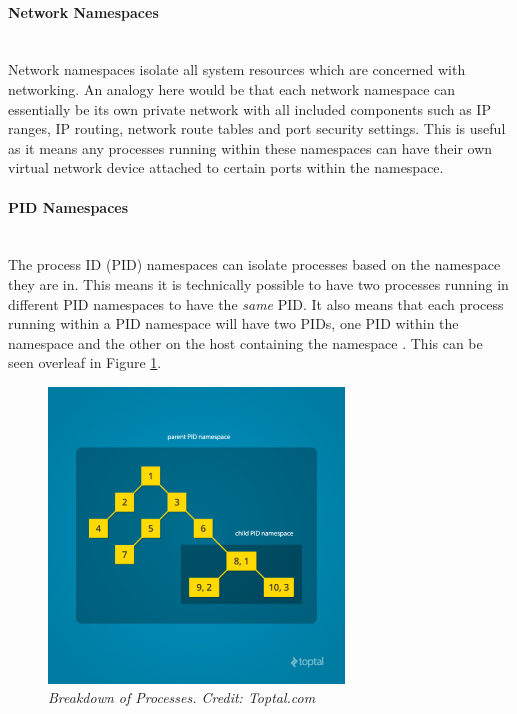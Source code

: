 \documentclass{article}
\begin{document}
\paragraph{Network Namespaces}\mbox{}\\
Network namespaces isolate all system resources which are concerned with networking. An analogy here would be that each network namespace can essentially be its own private network with all included components such as IP ranges, IP routing, network route tables and port security settings. This is useful as it means any processes running within these namespaces can have their own virtual network device attached to certain ports within the namespace.

\paragraph{PID Namespaces}\mbox{}\\
The process ID (PID) namespaces can isolate processes based on the namespace they are in. This means it is technically possible to have two processes running in different PID namespaces to have the \textit{same} PID. It also means that each process running within a PID namespace will have two PIDs, one PID within the namespace and the other on the host containing the namespace \citep{Kerrisk2013}. This can be seen overleaf in Figure \ref{fig:pid}.

\begin{figure}[!h]
\centering
\includegraphics*[width=0.7\textwidth]{components/images/pid}
\caption{\em Breakdown of Processes. Credit: Toptal.com}
\label{fig:pid}
\end{figure}
\end{document}
